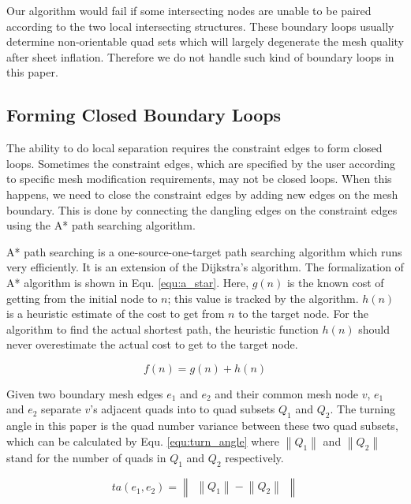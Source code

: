 \documentclass[final,5p,times,twocolumn]{elsarticle}
\begin{document}
Our algorithm would fail if some intersecting nodes are unable to be paired according to the two local intersecting structures. These boundary loops usually determine non-orientable quad sets\cite{Suzuki:2010hn} which will largely degenerate the mesh quality after sheet inflation. Therefore we do not handle such kind of boundary loops in this paper.

\subsection{Forming Closed Boundary Loops}
\label{sec:close_bound_loop}
The ability to do local separation requires the constraint edges to form closed loops. Sometimes the constraint edges, which are specified by the user according to specific mesh modification requirements, may not be closed loops. When this happens, we need to close the constraint edges by adding new edges on the mesh boundary. This is done by connecting the dangling edges on the constraint edges using the A* path searching algorithm.

A* path searching is a one-source-one-target path searching algorithm which runs very efficiently\cite{hart1968formal}. It is an extension of the Dijkstra's algorithm\cite{Dijkstra1959A}. The formalization of A* algorithm is shown in Equ. \ref{equ:a_star}. Here, $g(n)$ is the known cost of getting from the initial node to $n$; this value is tracked by the algorithm. $h(n)$ is a heuristic estimate of the cost to get from $n$ to the target node. For the algorithm to find the actual shortest path, the heuristic function $h(n)$ should never overestimate the actual cost to get to the target node.

\begin{equation}
\label{equ:a_star}
f(n)=g(n) + h(n)
\end{equation}

Given two boundary mesh edges $e_1$ and $e_2$ and their common mesh node $v$, $e_1$ and $e_2$ separate $v$'s adjacent quads into to quad subsets $Q_1$ and $Q_2$. The turning angle in this paper is the quad number variance between these two quad subsets, which can be calculated by Equ. \ref{equ:turn_angle} where $\left \| Q_1 \right \|$ and $\left \| Q_2 \right \|$ stand for the number of quads in $Q_1$ and $Q_2$ respectively.

\begin{equation}
\label{equ:turn_angle}
ta(e_1,e_2)=\begin{Vmatrix}
\left \| Q_1 \right \| - \left \| Q_2 \right \|
\end{Vmatrix}
\end{equation}
\end{document}
